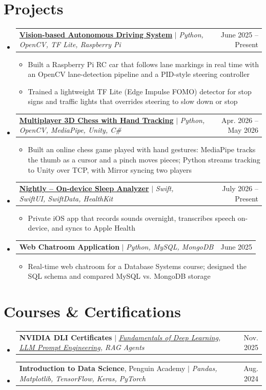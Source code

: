 \documentclass[letterpaper,11pt]{article}
\makeatletter
\newcommand{\resumeItem}[1]{
  \item\small{
    {#1 \vspace{-2pt}}
  }
}
\newcommand{\resumeProjectHeading}[2]{
    \item
    \begin{tabular*}{0.97\textwidth}{l@{\extracolsep{\fill}}r}
      \small#1 & #2 \\
    \end{tabular*}\vspace{-7pt}
}
\newcommand{\resumeSubHeadingListStart}{\begin{itemize}[leftmargin=0.15in, label={}]}
\newcommand{\resumeSubHeadingListEnd}{\end{itemize}}
\newcommand{\resumeItemListStart}{\begin{itemize}}
\newcommand{\resumeItemListEnd}{\end{itemize}\vspace{-5pt}}
\makeatother
\begin{document}
\section{Projects}
    \resumeSubHeadingListStart
      \resumeProjectHeading
          {\textbf{\href{https://github.com/tobiascca/Vision-based-Autonomous-Driving-System}{Vision-based Autonomous Driving System}} $|$ \emph{Python, OpenCV, TF Lite, Raspberry Pi}}{June 2025 -- Present}
          \resumeItemListStart
            \resumeItem{Built a Raspberry Pi RC car that follows lane markings in real time with an OpenCV lane-detection pipeline and a PID-style steering controller}
            \resumeItem{Trained a lightweight TF Lite (Edge Impulse FOMO) detector for stop signs and traffic lights that overrides steering to slow down or stop}
          \resumeItemListEnd
      \resumeProjectHeading
          {\textbf{\href{https://github.com/tobiascca/3D-Chess-with-HandTracking}{Multiplayer 3D Chess with Hand Tracking}} $|$ \emph{Python, OpenCV, MediaPipe, Unity, C\#}}{Apr. 2026 -- May 2026}
          \resumeItemListStart
            \resumeItem{Built an online chess game played with hand gestures: MediaPipe tracks the thumb as a cursor and a pinch moves pieces; Python streams tracking to Unity over TCP, with Mirror syncing two players}
          \resumeItemListEnd
      \resumeProjectHeading
          {\textbf{\href{https://github.com/tobiascca/nightly-AI-sleep-analyzer-app}{Nightly -- On-device Sleep Analyzer}} $|$ \emph{Swift, SwiftUI, SwiftData, HealthKit}}{July 2026 -- Present}
          \resumeItemListStart
            \resumeItem{Private iOS app that records sounds overnight, transcribes speech on-device, and syncs to Apple Health}
          \resumeItemListEnd
      \resumeProjectHeading
          {\textbf{Web Chatroom Application} $|$ \emph{Python, MySQL, MongoDB}}{June 2025}
          \resumeItemListStart
            \resumeItem{Real-time web chatroom for a Database Systems course; designed the SQL schema and compared MySQL vs. MongoDB storage}
          \resumeItemListEnd
    \resumeSubHeadingListEnd

\section{Courses \& Certifications}
  \resumeSubHeadingListStart
    \resumeProjectHeading
      {\textbf{NVIDIA DLI Certificates} $|$ \emph{\href{https://learn.nvidia.com/certificates?id=1tO0Ys3ITkGJkXM3sgBKrQ}{\underline{Fundamentals of Deep Learning}}, \href{https://learn.nvidia.com/certificates?id=g-2IIRd1RO6ZWcYuaAXLtA}{\underline{LLM Prompt Engineering}}, RAG Agents}}{Nov. 2025}
    \resumeProjectHeading
      {\textbf{Introduction to Data Science}, Penguin Academy $|$ \emph{Pandas, Matplotlib, TensorFlow, Keras, PyTorch}}{Aug. 2024}
  \resumeSubHeadingListEnd
\end{document}
